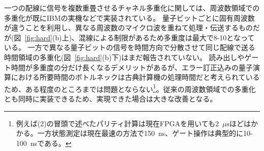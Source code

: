 \documentclass[11pt,a4j,dvipdfmx]{jarticle} 					%
\newcommand{\研究課題名}{誤り耐性量子コンピュータに向けた誤り訂正技術の開発(仮)}
\newcommand{\研究機関名}{東京大学}
\newcommand{\研究代表者氏名}{寺師弘二}
\newcommand{\研究期間の最終元号年度}{10}  %
\newcommand{\mybf}[1]{{\bfseries\sffamily#1}}
\begin{document}
一つの配線に信号を複数重畳させるチャネル多重化に関しては、周波数領域での多重化が既にIBMの実機などで実装されている。
量子ビットごとに固有周波数が違うことを利用し、異なる周波数のマイクロ波を重ねて処理・伝送するものだが(図~\ref{fig:hard}(b)上)、混線による制限があるため多重度は最大で8-10となっている。
一方で異なる量子ビットの信号を時間方向で分散させて同じ配線で送る時間領域の多重化(図~\ref{fig:hard}(b)下)はまだ報告されていない。
読み出しやゲート時間が多重度の分だけ長くなるデメリットがあるが、エラー訂正込みの量子演算における所要時間のボトルネックは古典計算機の処理時間だと考えられているため、ある程度のところまでは問題とならない\footnote{例えば(2)の冒頭で述べたパリティ計算は現在FPGAを用いても2~${\mu \mathrm{s}}$ほどはかかる。一方状態測定は現在最速の方法で150~ns、ゲート操作は典型的に10-100~nsである。}。従来の周波数領域での多重化とも同時に実装できるため、実現できた場合は大きな改善となる。\\


%

\end{document}
